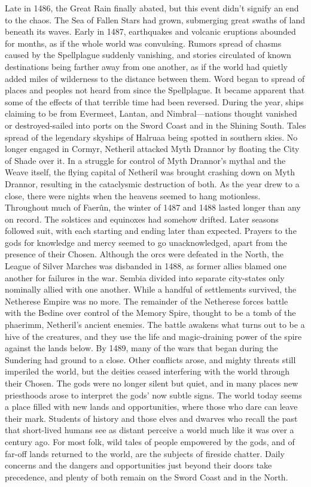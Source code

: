 \documentclass[10pt,a4paper,twoside,twocolumn,openany,bg=print,nodeprecatedcode]{dndbook}
\begin{document}
Late in 1486, the Great Rain finally abated, but this event didn't signify an end to the chaos. The Sea of Fallen Stars had grown, submerging great swaths of land beneath its waves.
Early in 1487, earthquakes and volcanic eruptions abounded for months, as if the whole world was convulsing. Rumors spread of chasms caused by the Spellplague suddenly vanishing, and stories circulated of known destinations being farther away from one another, as if the world had quietly added miles of wilderness to the distance between them. Word began to spread of places and peoples not heard from since the Spellplague. It became apparent that some of the effects of that terrible time had been reversed. During the year, ships claiming to be from Evermeet, Lantan, and Nimbral—nations thought vanished or destroyed-sailed into ports on the Sword Coast and in the Shining South. Tales spread of the legendary skyships of Halruaa being spotted in southern skies. No longer engaged in Cormyr, Netheril attacked Myth Drannor by floating the City of Shade over it. In a struggle for control of Myth Drannor's mythal and the Weave itself, the flying capital of Netheril was brought crashing down on Myth Drannor, resulting in the cataclysmic destruction of both.
As the year drew to a close, there were nights when the heavens seemed to hang motionless. Throughout much of Faerûn, the winter of 1487 and 1488 lasted longer than any on record. The solstices and equinoxes had somehow drifted. Later seasons followed suit, with each starting and ending later than expected. Prayers to the gods for knowledge and mercy seemed to go unacknowledged, apart from the presence of their Chosen.
Although the orcs were defeated in the North, the League of Silver Marches was disbanded in 1488, as former allies blamed one another for failures in the war. Sembia divided into separate city-states only nominally allied with one another. While a handful of settlements survived, the Netherese Empire was no more. The remainder of the Netherese forces battle with the Bedine over control of the Memory Spire, thought to be a tomb of the phaerimm, Netheril's ancient enemies. The battle awakens what turns out to be a hive of the creatures, and they use the life and magic-draining power of the spire against the lands below.
By 1489, many of the wars that began during the Sundering had ground to a close. Other conflicts arose, and mighty threats still imperiled the world, but the deities ceased interfering with the world through their Chosen. The gods were no longer silent but quiet, and in many places new priesthoods arose to interpret the gods' now subtle signs.
The world today seems a place filled with new lands and opportunities, where those who dare can leave their mark. Students of history and those elves and dwarves who recall the past that short-lived humans see as distant perceive a world much like it was over a century ago. For most folk, wild tales of people empowered by the gods, and of far-off lands returned to the world, are the subjects of fireside chatter. Daily concerns and the dangers and opportunities just beyond their doors take precedence, and plenty of both remain on the Sword Coast and in the North.
\end{document}
